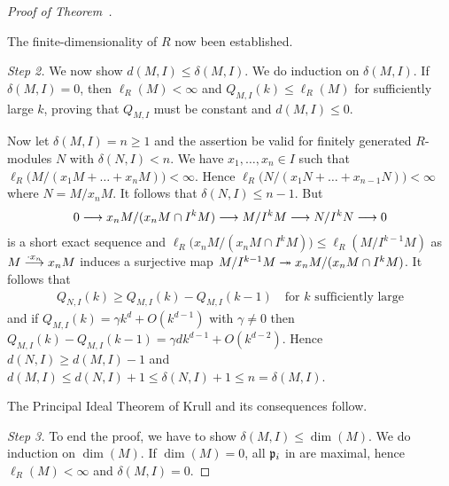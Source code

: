 \documentclass[a4paper,parskip=half,numbers=enddot, DIV=12]{scrreprt}
\begin{document}
\begin{proof}[Proof of Theorem~]
    \begin{cor*}
        The finite-dimensionality of $R$ now been established.
    \end{cor*}
    
    \emph{Step 2.} We now show $d(M,I)\leq \delta(M,I)$. We do induction on $\delta(M,I)$. If $\delta(M,I) = 0$, then $\ell_R(M) < \infty$ and $Q_{M,I}(k) \leq \ell_R(M)$ for sufficiently large $k$, proving that $Q_{M,I}$ must be constant and $d(M,I)\leq 0$. 
    
    Now let $\delta(M,I) =n\geq 1$ and the assertion be valid for finitely generated $R$-modules $N$ with $\delta(N,I) < n$. We have $x_1,\ldots,x_n\in I$ such that $\ell_R\big(M/(x_1M+\ldots+x_nM)\big)< \infty$. Hence $\ell_R\big(N/(x_1N+\ldots+x_{n-1}N)\big) < \infty$ where $N=M/x_n M$. It follows that $\delta(N,I) \leq n-1$. But
    \begin{align*}
        0 \morphism x_nM/(x_nM\cap I^k M) \morphism M/I^kM \morphism N/I^k N\morphism 0
    \end{align*}
    is a short exact sequence and $\ell_R\big(x_nM/(x_nM\cap I^k M)\big) \leq \ell_R(M/I^{k-1} M)$ as $M\morphism[\cdot x_n]x_nM$ induces a surjective map $M/I^{k-1} M \epimorphism x_nM / (x_nM \cap I^k M)$. It follows that 
    \begin{align*}
    	Q_{N,I}(k) \geq Q_{M,I}(k) - Q_{M,I}(k-1)\quad \text{for }k\text{ sufficiently large}
    \end{align*}
    and if $Q_{M,I} (k) = \gamma k^d + O(k^{d-1})$ with $\gamma\neq0$ then $Q_{M,I}(k) - Q_{M,I}(k-1) = \gamma dk^{d-1} + O(k^{d-2})$. Hence $d(N,I)\geq d(M,I) -1$ and $d(M,I) \leq d(N,I) +1 \leq \delta(N,I) +1 \leq n=\delta(M,I)$.
    
    \begin{cor*}[*facepalm*]
        The Principal Ideal Theorem of Krull and its consequences follow.
    \end{cor*}
    
    \emph{Step 3.} To end the proof, we have to show $\delta(M,I) \leq \dim(M)$. We do induction on $\dim(M)$. If $\dim(M) = 0$, all $\mathfrak{p}_i$ in  are maximal, hence $\ell_R(M) < \infty$ and $\delta(M,I) =0$. 
    

\end{proof}
\end{document}
